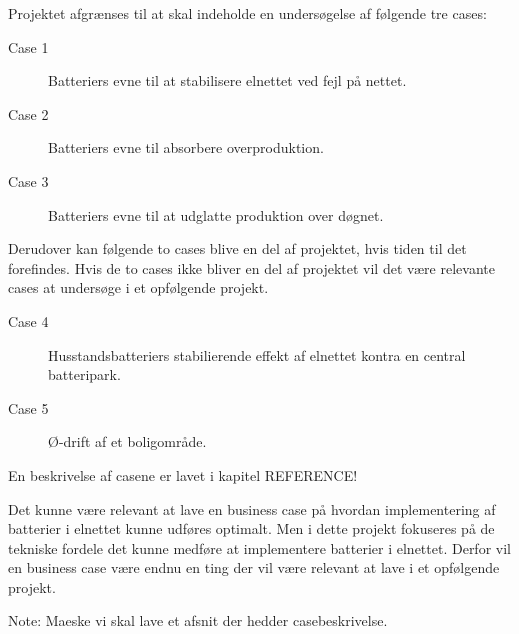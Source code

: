 
\label{Afgraensning}

Projektet afgrænses til at skal indeholde en undersøgelse af følgende tre cases:

\begin{description}
	\item[Case 1] Batteriers evne til at stabilisere elnettet ved fejl på nettet.
	\item[Case 2] Batteriers evne til absorbere overproduktion.
	\item[Case 3] Batteriers evne til at udglatte produktion over døgnet.
\end{description}	
	
Derudover kan følgende to cases blive en del af projektet, hvis tiden til det forefindes. Hvis de to cases ikke bliver en del af projektet vil det være relevante cases at undersøge i et opfølgende projekt.

\begin{description}
	\item[Case 4] Husstandsbatteriers stabilierende effekt af elnettet kontra en central batteripark.
	\item[Case 5] Ø-drift af et boligområde.
\end{description}

En beskrivelse af casene er lavet i kapitel REFERENCE!

Det kunne være relevant at lave en business case på hvordan implementering af batterier i elnettet kunne udføres optimalt. Men i dette projekt fokuseres på de tekniske fordele det kunne medføre at implementere batterier i elnettet. Derfor vil en business case være endnu en ting der vil være relevant at lave i et opfølgende projekt.

Note: Maeske vi skal lave et afsnit der hedder casebeskrivelse.